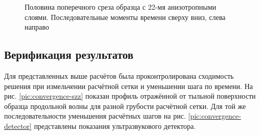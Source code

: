 \begin{figure}%
	\caption{Половина поперечного среза образца с 22-мя анизотропными слоями. Последовательные моменты времени сверху вниз, слева направо}
	\label{pic:22layers}
\end{figure}

\subsection{Верификация результатов}
Для представленных выше расчётов была проконтролирована сходимость решения при измельчении расчётной сетки и уменьшении шага по времени. На рис. \ref{pic:convergence-szz} показан профиль отражённой от тыльной поверхности образца продольной волны для разной грубости расчётной сетки. Для той же последовательности уменьшения расчётных шагов на рис. \ref{pic:convergence-detector} представлены показания ультразвукового детектора.

